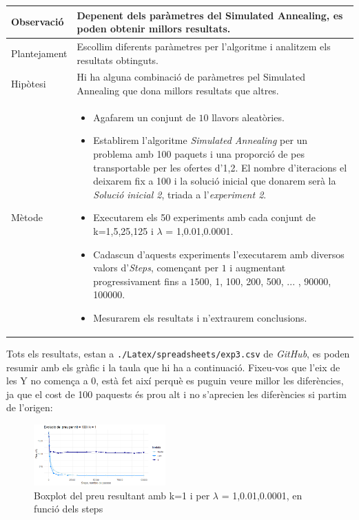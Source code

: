 \documentclass[a4paper]{article}
\begin{document}
	\begin{table}[ht]
		\centering
		\begin{tabular}{|l|p{10cm}|}
			\hline
			Observació & Depenent dels paràmetres del Simulated Annealing, es poden obtenir millors resultats. \\
			\hline
			Plantejament & Escollim diferents paràmetres per l'algoritme i analitzem els resultats obtinguts. \\
			\hline
			Hipòtesi & Hi ha alguna combinació de paràmetres pel Simulated Annealing que dona millors resultats que altres.\\
			\hline
			Mètode &
			\begin{itemize}
				\item Agafarem un conjunt de $10$ llavors aleatòries.
				\item Establirem l'algoritme \textit{Simulated Annealing} per un problema amb 100 paquets i una proporció de pes transportable per les ofertes d'1,2. El nombre d'iteracions el deixarem fix a 100 i la solució inicial que donarem serà la \textit{Solució inicial 2}, triada a l'\textit{experiment 2}.
				\item Executarem els 50 experiments amb cada conjunt de k={1,5,25,125} i $\lambda$ = {1,0.01,0.0001}.
				\item Cadascun d'aquests experiments l'executarem amb diversos valors d'\textit{Steps}, començant per $1$ i augmentant progressivament fins a $1500$, {1, 100, 200, 500, ... , 90000, 100000}. 
				\item Mesurarem els resultats i n'extraurem conclusions.
			\end{itemize} \\
			\hline
		\end{tabular}
		\label{tab:exp3_apartats}
	\end{table}
	
	Tots els resultats, estan a \texttt{./Latex/spreadsheets/exp3.csv} de \textit{GitHub}, es poden resumir amb els gràfic i la taula que hi ha a continuació. Fixeu-vos que l'eix de les Y no comença a 0, està fet així perquè es puguin veure millor les diferències, ja que el cost de 100 paquests és prou alt i no s'aprecien les diferències si partim de l'origen:
	
	\begin{figure}[H]
		\centering
		\includegraphics[width=0.45\textwidth]{images/exp3_k1.png}
		\caption{Boxplot del preu resultant amb k=1 i per $\lambda$ = {1,0.01,0.0001}, en funció dels steps}
		\label{fig:exp3_k1}
	\end{figure}
	
\end{document}
